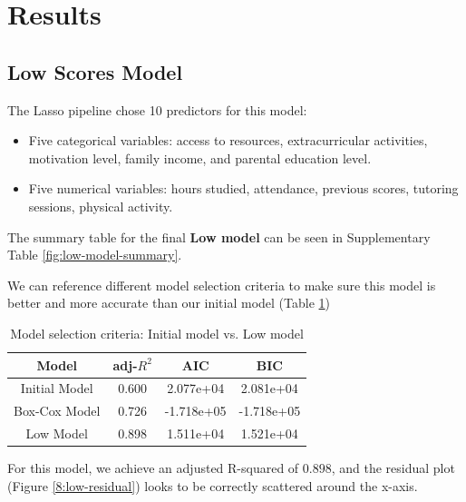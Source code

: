 \documentclass[twocolumn]{article} %
\begin{document}
\section{Results}
\subsection*{Low Scores Model}

The Lasso pipeline chose 10 predictors for this model:

\begin{itemize}
  \item Five categorical variables: access to resources, extracurricular activities, motivation level, family income, and parental education level.
  \item Five numerical variables: hours studied, attendance, previous scores, tutoring sessions, physical activity.
\end{itemize}

The summary table for the final \textbf{Low model} can be seen in Supplementary Table \ref{fig:low-model-summary}.

We can reference different model selection criteria to make sure this model is better and more accurate than our initial model (Table \ref{model-selection-low})

\begin{table}[ht]
  \begin{tabular}{|c|c|c|c|}
      \hline
      \textbf{Model} & \textbf{adj-$R^2$} & \textbf{AIC} & \textbf{BIC} \\ \hline
      Initial Model   & 0.600  & 2.077e+04  & 2.081e+04  \\ \hline
      Box-Cox Model   & 0.726  & -1.718e+05  & -1.718e+05  \\ \hline
      Low Model       & 0.898  & 1.511e+04  & 1.521e+04  \\ \hline
  \end{tabular}
  \caption{Model selection criteria: Initial model vs. Low model}
  \label{model-selection-low}
\end{table}

For this model, we achieve an adjusted R-squared of $0.898$, and the residual plot (Figure \ref{8:low-residual}) looks to be correctly scattered around the x-axis.
\end{document}
